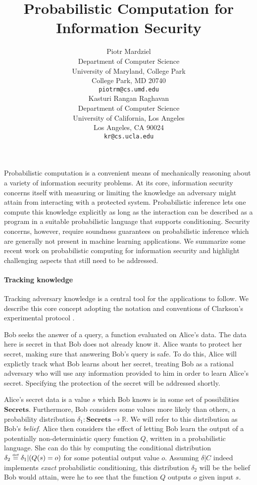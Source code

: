 \documentclass{article} %
\title{Probabilistic Computation for Information Security}
\author{
Piotr Mardziel\\
Department of Computer Science\\
University of Maryland, College Park\\
College Park, MD 20740 \\
\texttt{piotrm@cs.umd.edu} \\
\And
Kasturi Rangan Raghavan\\
Department of Computer Science\\
University of California, Los Angeles\\
Los Angeles, CA 90024\\
\texttt{kr@cs.ucla.edu} \\
}
\newcommand{\ra}{\rightarrow}
\newcommand{\Real}{\mathbb{R}}
\newcommand{\secrets}[0]{\textbf{Secrets}}
\newcommand{\rsecret}[0]{s}
\newcommand{\cond}[0]{|}
\newcommand{\stacklabel}[1]{\stackrel{\smash{\scriptscriptstyle \mathrm{#1}}}}
\newcommand{\defeq}{\stacklabel{def}=}
\theoremstyle{plain} %
\theoremstyle{definition} %
\begin{document}
\maketitle

Probabilistic computation is a convenient means of mechanically
reasoning about a variety of information security problems. At its
core, information security concerns itself with measuring or limiting
the knowledge an adversary might attain from interacting with a
protected system. Probabilistic inference lets one compute this
knowledge explicitly as long as the interaction can be described as a
program in a suitable probabilistic language that supports
conditioning. Security concerns, however, require soundness guarantees
on probabilistic inference which are generally not present in machine
learning applications. We summarize some recent work on probabilistic
computing for information security and highlight challenging aspects
that still need to be addressed.

\paragraph*{Tracking knowledge}

Tracking adversary knowledge is a central tool for the applications to
follow. We describe this core concept adopting the notation and
conventions of Clarkson's experimental protocol
\cite{clarkson09quantifying}.

Bob seeks the answer of a query, a function evaluated on Alice's data.
The data here is secret in that Bob does not already know it.
Alice wants to protect her secret, making sure that answering
Bob's query is safe.
To do this, Alice will explictly track what Bob
learns about her secret, treating Bob as a rational adversary
who will use any information provided to him in order to learn Alice's
secret. Specifying the protection of the secret will be addressed shortly.

Alice's secret data is a value $ \rsecret $ which Bob knows is in some
set of possibilities $ \secrets $. Furthermore, Bob considers some
values more likely than others, a probability distribution $ \delta_1
: \secrets \ra \Real $. We will refer to this distribution as Bob's
\emph{belief}. Alice then considers the effect of letting Bob learn
the output of a potentially non-deterministic query function $ Q $, written
in a probabilistic language. She can do this by computing the
conditional distribution $ \delta_2 \defeq \delta_1 \cond (Q(\rsecret)
= o) $ for some potential output value $ o $. Assuming $ \delta | C $
indeed implements \emph{exact} probabilistic conditioning, this
distribution $ \delta_2 $ will be the belief Bob would attain, were he
to see that the function $ Q $ outputs $ o $ given input $ \rsecret $.
\end{document}
